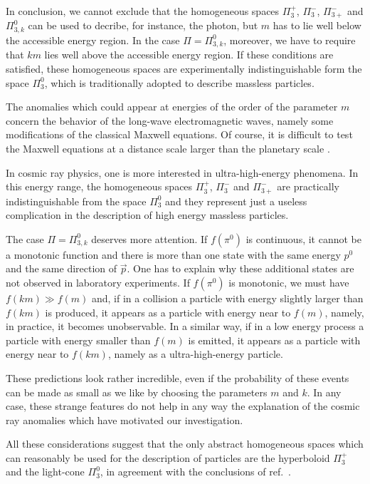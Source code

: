 \documentclass[a4paper,12pt]{article}
\begin{document}
In conclusion, we cannot exclude that the homogeneous spaces $\Pi_3^+$, $\Pi_3^-$, $\Pi_{3+}^-$ and $\Pi_{3,k}^0$ can be used to decribe, for instance, the photon, but $m$ has to lie well below the accessible energy region. In the case $\Pi = \Pi_{3,k}^0$, moreover, we have to require that $k m$ lies well above the accessible energy region. If these conditions are satisfied, these homogeneous spaces are experimentally indistinguishable form the space $\Pi_3^0$, which is traditionally adopted to describe massless particles.

The anomalies which could appear at energies of the order of the parameter $m$ concern the behavior of the
long-wave electromagnetic waves, namely some modifications of the classical Maxwell equations. Of course, it is difficult to test the Maxwell equations at a distance scale larger than the planetary scale \cite{Jackson}.

In cosmic ray physics, one is more interested in ultra-high-energy phenomena. In this energy range, the homogeneous spaces $\Pi_3^+$, $\Pi_3^-$ and $\Pi_{3+}^-$ are practically indistinguishable from the space $\Pi_3^0$ and they represent just a useless complication in the description of high energy massless particles. 

The case $\Pi = \Pi_{3,k}^0$ deserves more attention. If $f(\pi^0)$ is continuous, it cannot be a monotonic function and there is more than one state with the same energy $p^0$ and the same direction of $\vec p$. One has to explain why these additional states are not observed in laboratory experiments. If $f(\pi^0)$ is monotonic, we must have $f(km) \gg f(m)$ and, if in a collision a particle with energy slightly larger than $f(km)$ is produced, it appears as a particle with energy near to $f(m)$, namely, in practice, it becomes unobservable. In a similar way, if in a low energy process a particle with energy smaller than $f(m)$ is emitted, it appears as a particle with energy near to $f(km)$, namely as a ultra-high-energy particle. 

These predictions look rather incredible, even if the probability of these events can be made as small as we like by choosing the parameters $m$ and $k$.  In any case, these strange features do not help in any way the explanation of the cosmic ray anomalies which have motivated our investigation.

All these considerations suggest that the only abstract homogeneous spaces which can reasonably be used for the description of particles are the hyperboloid $\Pi_3^+$ and the light-cone $\Pi_3^0$, in agreement with the conclusions of ref.\ \cite{Toller}. 
\end{document}
